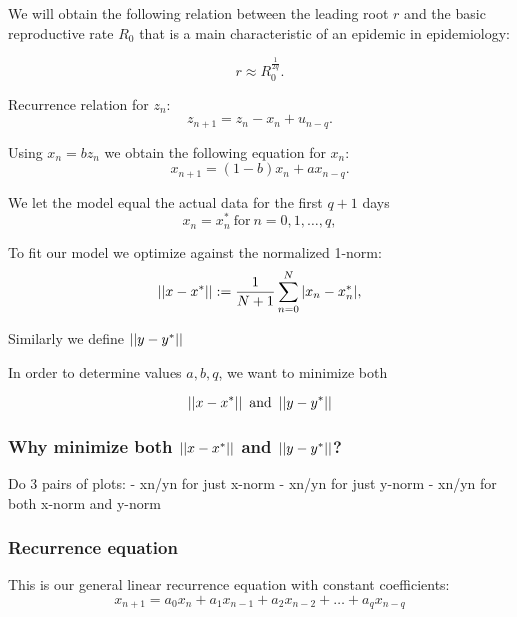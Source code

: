 We will obtain the following relation between the leading root $r$ and the basic reproductive rate $R_0$ that is a main characteristic of an epidemic in epidemiology:

\begin{equation}\label{eq:R0}
    r \approx R_0^{\frac1{2q}}.
\end{equation}

Recurrence relation for $z_n$:
\begin{equation} \label{eq:znrecurr}
    z_{n+1} = z_n - x_n + u_{n-q}.
\end{equation}

Using $x_n = bz_n$ we obtain the following equation for $x_n$:
\begin{equation} \label{eq:xnrecurr}
    x_{n+1} = (1 - b) x_n + ax_{n-q}.
\end{equation}

We let the model equal the actual data for the first $q+1$ days
\begin{equation} \label{eq:xn0q}
x_n = x^*_n \ \text{for} \ n = 0, 1, \dots , q,
\end{equation}

 To fit our model we optimize against the normalized 1-norm:
\begin{equation}\label{eq:xnnorm}
    \left|\left|x-x^*\right|\right|:= \frac{1}{N+1} \sum\limits_{n=0}^N |x_n-x_n^*|,
\end{equation}

Similarly we define $\left|\left|y-y^*\right|\right|$

In order to determine values $a,b,q$, we want to minimize both 

\begin{equation} \label{eq:norms}
    \left|\left|x-x^*\right|\right| \ \text{and} \ \left|\left|y-y^*\right|\right|
\end{equation}

\subsubsection{Why minimize both  $\left|\left|x-x^*\right|\right|$ \textbf{and} $\left|\left|y-y^*\right|\right|$?}

Do 3 pairs of plots: 
- xn/yn for just x-norm
- xn/yn for just y-norm
- xn/yn for both x-norm and y-norm


\subsubsection{Recurrence equation}

This is our general linear recurrence equation with constant coefficients:
\begin{equation}\label{eq:an}
    x_{n+1} = a_0x_n + a_1x_{n-1} + a_2x_{n-2} + \dots + a_{q}x_{n-q}
\end{equation}

